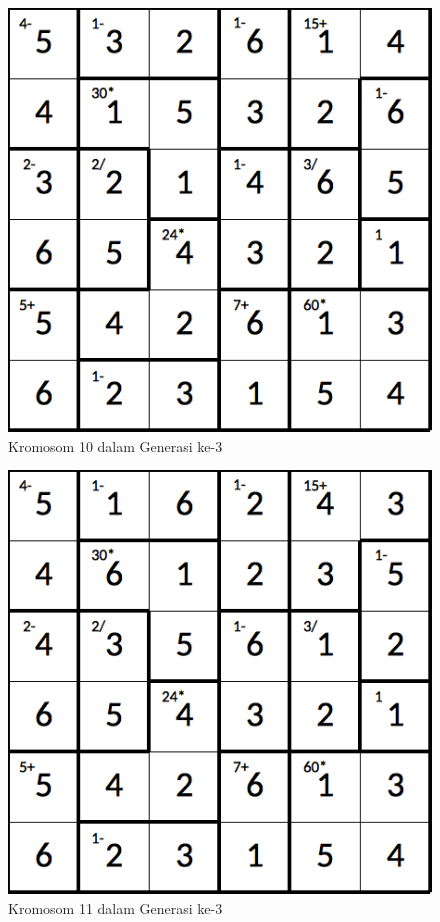 \documentclass[a4paper,twoside]{article}
\begin{document}
\begin{enumerate}
\begin{figure}
\centering
\captionsetup{justification=centering}
\includegraphics[scale=0.333]{Gambar/hybridgenetic/Generation3Chromosome10}
\caption[Kromosom 10 dalam Generasi ke-3]{Kromosom 10 dalam Generasi ke-3}
\label{fig:analisisg3k10}
\end{figure}

\begin{figure}
\centering
\captionsetup{justification=centering}
\includegraphics[scale=0.333]{Gambar/hybridgenetic/Generation3Chromosome11}
\caption[Kromosom 11 dalam Generasi ke-3]{Kromosom 11 dalam Generasi ke-3}
\label{fig:analisisg3k11}
\end{figure}


\end{enumerate}
\end{document}
